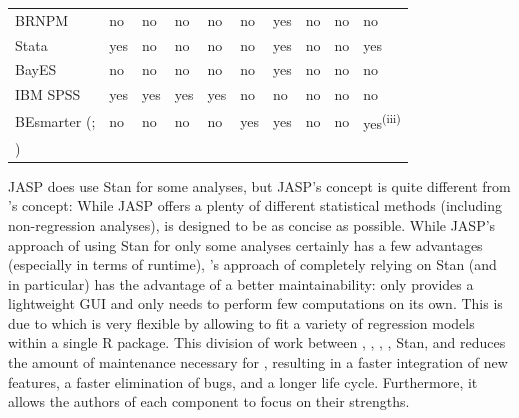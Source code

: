 \begin{table}
\begin{tabular}{ll|llll|lll|l}
    BRNPM \citep{karabatsos_menu-driven_2015, karabatsos_menu-driven_2017} & {\color{dgray}no} & {\color{dgray}no} & {\color{dgray}no} & {\color{dgray}no} & {\color{dgray}no} & yes & {\color{dgray}no} & {\color{dgray}no} & {\color{dgray}no} \\
    Stata \citep{statacorp_stata_2019} & yes & {\color{dgray}no} & {\color{dgray}no} & {\color{dgray}no} & {\color{dgray}no} & yes & {\color{dgray}no} & {\color{dgray}no} & yes \\
    BayES \citep{emvalomatis_bayes_2020} & {\color{dgray}no} & {\color{dgray}no} & {\color{dgray}no} & {\color{dgray}no} & {\color{dgray}no} & yes & {\color{dgray}no} & {\color{dgray}no} & {\color{dgray}no} \\
    IBM SPSS \citep{ibm_corp_ibm_2020} & yes & yes & yes & yes & {\color{dgray}no} & {\color{dgray}no} & {\color{dgray}no} & {\color{dgray}no} & {\color{dgray}no} \\
    BEsmarter (\citealp{besmarter_team_besmarter_2020, besmarter_team_besmartergui_2020}; & {\color{dgray}no} & {\color{dgray}no} & {\color{dgray}no} & {\color{dgray}no} & yes & yes & {\color{dgray}no} & {\color{dgray}no} & yes\textsuperscript{(iii)} \\
    \citealp{ramirez-hassan_guided_2021}) & & & & & & & & & \\
    \bottomrule
  \end{tabular}
\end{table}
JASP does use Stan for some analyses, but JASP's concept is
quite different from 's concept: While JASP offers a
plenty of different statistical methods (including non-regression analyses),
 is designed to be as concise as possible. While JASP's
approach of using Stan for only some analyses
certainly has a few advantages (especially in terms of runtime),
's approach of completely relying on Stan (and 
in particular) has the advantage of a better maintainability: 
only provides a lightweight GUI and only needs to perform few computations on
its own. This is due to  which is very flexible by allowing to fit a
variety of regression models within a single R package. This division of
work between , , , , Stan,
and  reduces the amount of maintenance necessary for
, resulting in a faster integration of new features, a faster
elimination of bugs, and a longer life cycle. Furthermore, it allows the
authors of each component to focus on their strengths.

